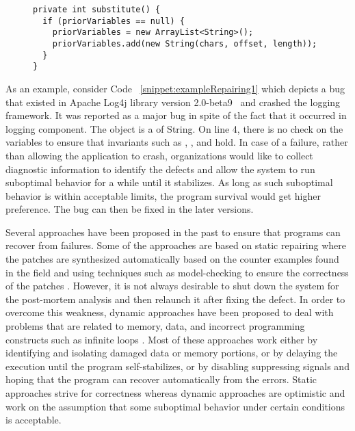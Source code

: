\lstset{language=Java , caption=Apache Log4j bug example,
label=snippet:exampleRepairing1}
\begin{figure}[t]
\begin{lstlisting}
private int substitute() {
  if (priorVariables == null) {
    priorVariables = new ArrayList<String>();
    priorVariables.add(new String(chars, offset, length));
  }
}
\end{lstlisting}
\end{figure}

As an example, consider Code ~\ref{snippet:exampleRepairing1} which depicts a
bug that
existed in Apache Log4j library version 2.0-beta9~\cite{ApacheLog4jBug} and crashed
the logging framework. It was reported as a major bug in
spite of the fact that it occurred in logging component. The object
 is a  of String. On line 4, there is no check on the variables to ensure
that invariants such as , , and  hold. In case of a failure, rather than allowing the application to crash, organizations would
like to collect diagnostic information to identify the defects and allow the system to run suboptimal behavior
for a while until it stabilizes. As long as such suboptimal behavior is within acceptable
limits, the program survival would get higher preference. The bug can then be
fixed in the later versions.

Several approaches have been proposed in the past to ensure that programs can
recover from failures. Some of the approaches are based on static repairing
where the patches are synthesized automatically based on the counter examples
found in the field and using techniques such as model-checking to ensure the
correctness of the patches \cite{}.
However, it is not always desirable to shut down the system for the post-mortem analysis and then relaunch it
after fixing the defect. In order to overcome this weakness,
dynamic approaches have been proposed to deal with problems that are
related to memory, data, and incorrect programming constructs such as infinite
loops \cite{}. Most of these approaches work either by identifying and isolating
damaged data or memory portions, or by delaying the execution until the program
self-stabilizes, or by disabling suppressing signals and hoping that the
program can recover automatically from the errors. Static approaches strive
for correctness whereas dynamic approaches are optimistic and work on the
assumption that some suboptimal behavior under certain conditions is acceptable.

